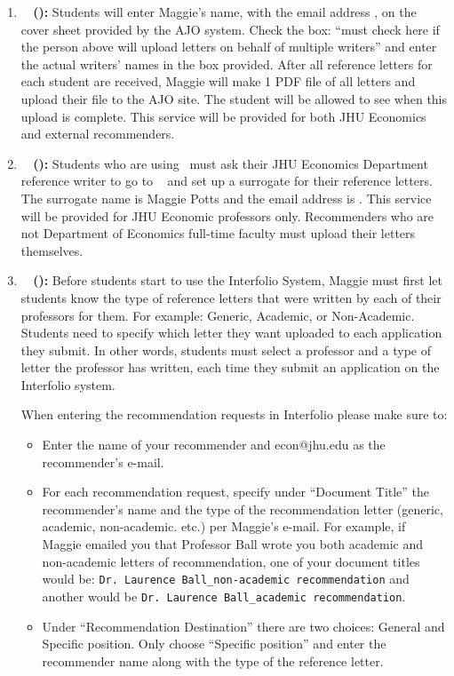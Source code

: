 \documentclass{econtex}
\begin{document}
\begin{enumerate}
\begin{itemize}
\end{itemize}

\item {\bf \AJO ~ (\AJOLink):}
Students will enter Maggie's name, with the email address \JMStaffEmail, on the cover sheet provided by the AJO system. Check the box: ``must check here if the person above will upload letters on behalf of multiple writers'' and enter the actual writers' names in the box provided. After all reference letters for each student are received, Maggie will make 1 PDF file of all letters and upload their file to the AJO site. The student will be allowed to see when this upload is complete. This service will be provided for both JHU Economics and external recommenders.

\item {\bf \AEA ~ (\AEALink):}
Students who are using \AEA~must ask their JHU Economics Department reference writer to go to \AEARecLink~ and set up a surrogate for their reference letters. The surrogate name is Maggie Potts and the email address is \JMStaffEmail. This service will be provided for JHU Economic professors only. Recommenders who are not Department of Economics full-time faculty must upload their letters themselves.


\item {\bf \Interfolio ~ (\InterfolioLink):}
Before students start to use the Interfolio System, Maggie must first let students know the type of reference letters that were written by each of their professors for them. For example: Generic, Academic, or Non-Academic. Students need to specify which letter they want uploaded to each application they submit. In other words, students must select a professor and a type of letter the professor has written, each time they submit an application on the Interfolio system.

When entering the recommendation requests in Interfolio please make sure to:
\begin{itemize}
\item Enter the name of your recommender and econ@jhu.edu as the recommender's e-mail.
\item For each recommendation request, specify under ``Document Title'' the recommender's name and the type of the recommendation letter (generic, academic, non-academic. etc.) per Maggie's e-mail.
For example, if Maggie emailed you that Professor Ball wrote you both academic and non-academic letters of recommendation, one of your document titles would be: \texttt{Dr. Laurence Ball\_non-academic recommendation} and another would be \texttt{Dr. Laurence Ball\_academic recommendation}.
\item Under ``Recommendation Destination'' there are two choices: General and Specific position. Only choose ``Specific position'' and enter the recommender name along with the type of the reference letter.
\end{itemize}


\end{enumerate}
\end{document}

